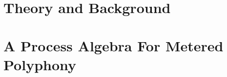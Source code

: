 %
%
%






\setlength{\parindent}{0pt}
\setlength{\parskip}{0pt} %
% 
% 
% 
% 
% 

\cleardoublepage
{}
\tableofcontents

% 


\setlength{\parskip}{1em}


\mainmatter

\cleardoublepage
\part{Theory and Background}
    
    
    
    

%
\cleardoublepage
\part{A Process Algebra For Metered Polyphony}
    
    

